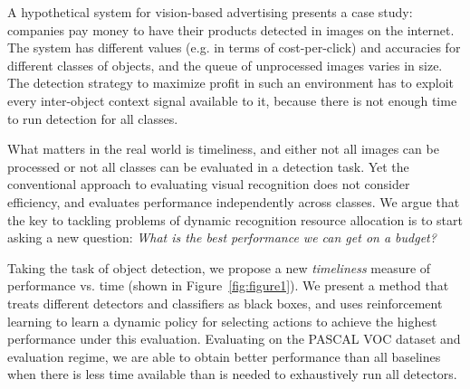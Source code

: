 A hypothetical system for vision-based advertising presents a case study: companies pay money to have their products detected in images on the internet.
The system has different values (e.g. in terms of cost-per-click) and accuracies for different classes of objects, and the queue of unprocessed images varies in size.
The detection strategy to maximize profit in such an environment has to exploit every inter-object context signal available to it, because there is not enough time to run detection for all classes.

What matters in the real world is timeliness, and either not all images can be processed or not all classes can be evaluated in a detection task.
Yet the conventional approach to evaluating visual recognition does not consider efficiency, and evaluates performance independently across classes.
We argue that the key to tackling problems of dynamic recognition resource allocation is to start asking a new question:
\emph{What is the best performance we can get on a budget?}

Taking the task of object detection, we propose a new \emph{timeliness} measure of performance vs. time (shown in Figure~\ref{fig:figure1}).
We present a method that treats different detectors and classifiers as black boxes, and uses reinforcement learning to learn a dynamic policy for selecting actions to achieve the highest performance under this evaluation.
Evaluating on the PASCAL VOC dataset and evaluation regime, we are able to obtain better performance than all baselines when there is less time available than is needed to exhaustively run all detectors.
